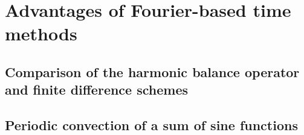 \chapter{Advantages of Fourier-based time methods}
\label{cha:advantages}

\chabstract{}

\minitoc
\newpage


\section{Comparison of the harmonic balance operator and finite difference schemes}
\label{sec:hb_operator}


\section{Periodic convection of a sum of sine functions}
\label{sec:sum_sine}


\chconclu{}
